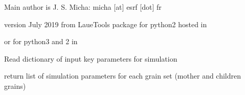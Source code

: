 \documentclass[letterpaper,10pt,english]{sphinxmanual}
\begin{document}
Main author is J. S. Micha:   micha {[}at{]} esrf {[}dot{]} fr

version July 2019
from LaueTools package for python2 hosted in


or for python3 and 2 in


\begin{fulllineitems}
\label{\detokenize{Simulation_Module:LaueTools.multigrainsSimulator.Read_GrainListparameter}}
Read dictionary of  input key parameters for simulation

\end{fulllineitems}


\begin{fulllineitems}
\label{\detokenize{Simulation_Module:LaueTools.multigrainsSimulator.Construct_GrainsParameters_parametric}}
return list of simulation parameters for each grain set (mother and children grains)

\end{fulllineitems}

\end{document}

